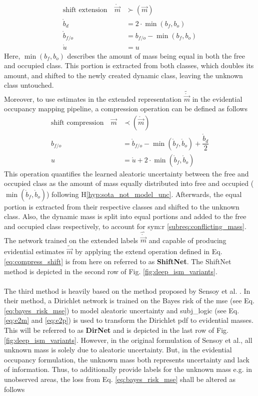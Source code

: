 \begin{align}
	\label{eq:extend_shift}
	\text{shift extension} \quad\mathring{\vec{m}} &\succ(\vec{m})\\
	\mathring{b}_d &= 2\cdot \min(b_f,b_o)\\
	\mathring{b}_{f/o} &= b_{f/o} - \min(b_f,b_o)\\
	\mathring{u} &= u
\end{align}
Here, $\min(b_f,b_o)$ describes the amount of mass being equal in both the free and occupied class. This portion is extracted from both classes, which doubles its amount, and shifted to the newly created dynamic class, leaving the unknown class untouched.\\ 
Moreover, to use estimates in the extended representation $\tilde{\mathring{\vec{m}}}$ in the evidential occupancy mapping pipeline, a compression operation can be defined as follows
\begin{align}
	\label{eq:compress_shift}
	\text{shift compression} \quad\vec{m} &\prec(\mathring{\vec{m}})\\
	b_{f/o} &= \mathring{b}_{f/o} - \min(\mathring{b}_f,\mathring{b}_o) + \dfrac{\mathring{b}_d}{2}\\
	u &= \mathring{u} + 2\cdot\min(\mathring{b}_f,\mathring{b}_o)
\end{align}
This operation quantifies the learned aleatoric uncertainty between the free and occupied class as the amount of mass equally distributed into free and occupied ($\min(\mathring{b}_f,\mathring{b}_o)$) following H\ref{hyp:sota_not_model_unc}. Afterwards, the equal portion is extracted from their respective classes and shifted to the unknown class. Also, the dynamic mass is split into equal portions and added to the free and occupied class respectively, to account for \gls{sym:r} \ref{subreq:conflicting_mass}. The network trained on the extended labels $\hat{\mathring{\vec{m}}}$ and capable of producing evidential estimates $\tilde{\vec{m}}$ by applying the extend operation defined in Eq. \ref{eq:compress_shift} is from here on referred to as \textbf{ShiftNet}. The ShiftNet method is depicted in the second row of Fig. \ref{fig:deep_ism_variants}.
\\\\
The third method is heavily based on the method proposed by Sensoy et al. \cite{sensoy2018evidential}. In their method, a Dirichlet network is trained on the Bayes risk of the \gls{mse} (see Eq. \ref{eq:bayes_risk_mse}) to model aleatoric uncertainty and \gls{subj_logic} (see Eq. \ref{eq:e2m} and \ref{eq:e2p}) is used to transform the Dirichlet \gls{pdf} to evidential masses. This will be referred to as \textbf{DirNet} and is depicted in the last row of Fig. \ref{fig:deep_ism_variants}. However, in the original formulation of Sensoy et al., all unknown mass is solely due to aleatoric uncertainty. But, in the evidential occupancy formulation, the unknown mass both represents uncertainty and lack of information. Thus, to additionally provide labels for the unknown mass e.g. in unobserved areas, the loss from Eq. \ref{eq:bayes_risk_mse} shall be altered as follows
